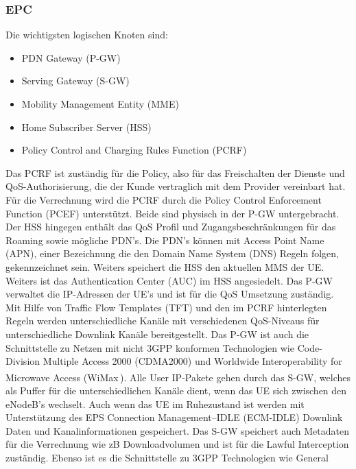 \subsubsection{EPC}
\label{subsubsec:epc}
Die wichtigsten logischen Knoten sind:
\begin{itemize}
	\item PDN Gateway (P-GW)
	\item Serving Gateway (S-GW)
	\item Mobility Management Entity (MME)
	\item Home Subscriber Server (HSS)
	\item Policy Control and Charging Rules Function (PCRF)
\end{itemize}
Das PCRF ist zuständig für die Policy, also für das Freischalten der Dienste und QoS-Authorisierung, die der Kunde vertraglich mit dem Provider vereinbart hat. Für die Verrechnung wird die PCRF durch die Policy Control Enforcement Function (PCEF) unterstützt. Beide sind physisch in der P-GW untergebracht. Der HSS hingegen enthält das QoS Profil und Zugangsbeschränkungen für das Roaming sowie mögliche PDN's. Die PDN's können mit Access Point Name (APN), einer Bezeichnung die den Domain Name System (DNS) Regeln folgen, gekennzeichnet sein. Weiters speichert die HSS den aktuellen MMS der UE. Weiters ist das Authentication Center (AUC) im HSS angesiedelt. Das P-GW verwaltet die IP-Adressen der UE's und ist für die QoS Umsetzung zuständig. Mit Hilfe von Traffic Flow Templates (TFT) und den im PCRF hinterlegten Regeln werden unterschiedliche Kanäle mit verschiedenen QoS-Niveaus für unterschiedliche Downlink Kanäle bereitgestellt. Das P-GW ist auch die Schnittstelle zu Netzen mit nicht 3GPP konformen Technologien wie Code-Division Multiple Access 2000 (CDMA2000) und Worldwide Interoperability for Microwave Access (WiMax\,\textsuperscript{\tiny\textregistered}). Alle User IP-Pakete gehen durch das S-GW, welches als Puffer für die unterschiedlichen Kanäle dient, wenn das UE sich zwischen den eNodeB's wechselt. Auch wenn das UE im Ruhezustand ist werden mit Unterstützung des EPS Connection Management--IDLE (ECM-IDLE)  Downlink Daten und Kanalinformationen gespeichert. Das S-GW speichert auch Metadaten für die Verrechnung wie zB Downloadvolumen und ist für die Lawful Interception zuständig. Ebenso ist es die Schnittstelle zu 3GPP Technologien wie General
